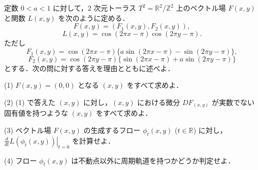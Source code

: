 \documentclass[12pt]{jlreq}
\newcommand{\R}{\mathbb{R}}
\newcommand{\Z}{\mathbb{Z}}
\begin{document}
定数 \(0 < a < 1\) に対して，\(2\) 次元トーラス \(T^2 = \R^2/\Z^2\) 上のベクトル場 \(F(x, y)\) と関数 \(L(x, y)\) を次のように定める．
\[
  F(x, y) = (F_1(x, y), F_2(x, y)),
\]
\[
  L(x, y) = \cos(2\pi x - \pi) \cos(2\pi y - \pi).
\]
ただし
\[
  F_1(x, y) = \cos(2\pi x - \pi) \{ a \sin(2\pi x - \pi) - \sin(2\pi y - \pi) \},
\]
\[
  F_2(x, y) = \cos(2\pi y - \pi) \{ \sin(2\pi x - \pi) + a \sin(2\pi y - \pi) \}
\]
とする．次の問に対する答えを理由とともに述べよ．

(1) \(F(x, y) = (0, 0)\) となる \((x, y)\) をすべて求めよ．

(2) (1) で答えた \((x, y)\) に対し，\((x, y)\) における微分 \(DF_{(x, y)}\) が実数でない固有値を持つような \((x, y)\) をすべて求めよ．

(3) ベクトル場 \(F(x, y)\) の生成するフロー \(\phi_t(x, y)\) (\(t \in \R\)) に対し，\(\left. \frac{d}{dt} L(\phi_t(x, y)) \right|_{t=0}\) を計算せよ．

(4) フロー \(\phi_t(x, y)\) は不動点以外に周期軌道を持つかどうか判定せよ．
\end{document}
